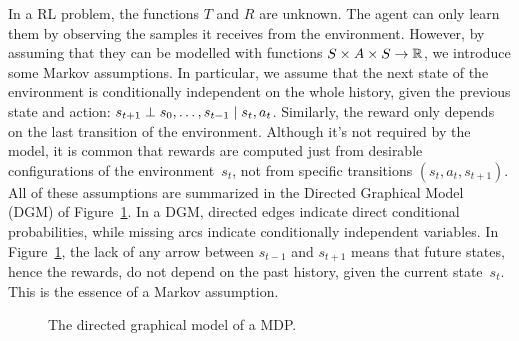 In a RL problem, the functions $T$ and $R$ are unknown. The agent can only
learn them by observing the samples it receives from the environment.
However, by assuming that they can be modelled with functions ${S \times
A \times S \to \mathbb{R}}$, we introduce some Markov assumptions. In
particular, we assume that the next state of the environment is conditionally
independent on the whole history, given the previous state and action:
$s_{t+1} \perp s_{0}, \dots, s_{t-1} \mid s_{t}, a_{t}$. Similarly, the
reward only depends on the last transition of the environment.  Although it's
not required by the model, it is common that rewards are computed just from
desirable configurations of the environment~$s_{t}$, not from specific
transitions $(s_{t}, a_{t}, s_{t+1})$. All of these assumptions are summarized
in the Directed Graphical Model (DGM) of Figure~\ref{fig:mdp}. In a DGM,
directed edges indicate direct conditional probabilities, while missing arcs
indicate conditionally independent variables.  In Figure~\ref{fig:mdp}, the
lack of any arrow between $s_{t-1}$ and $s_{t+1}$ means that future states,
hence the rewards, do not depend on the past history, given the current
state~$s_t$.  This is the essence of a Markov assumption.

\begin{figure}
	\centering
	\caption{The directed graphical model of a MDP.}
	\label{fig:mdp}
\end{figure}


